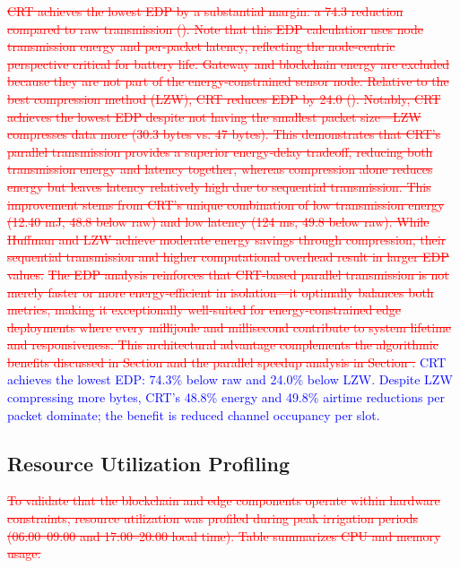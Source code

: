 \documentclass[pdflatex,sn-mathphys-num]{sn-jnl}
\theoremstyle{thmstyleone}
\theoremstyle{thmstyletwo}
\theoremstyle{thmstylethree}
\begin{document}
{\textcolor{red}{\sout{CRT achieves the lowest EDP by a substantial margin: a 74.3 reduction compared to raw transmission (). Note that this EDP calculation uses node transmission energy and per-packet latency, reflecting the node-centric perspective critical for battery life. Gateway and blockchain energy are excluded because they are not part of the energy-constrained sensor node. Relative to the best compression method (LZW), CRT reduces EDP by 24.0 (). Notably, CRT achieves the lowest EDP despite not having the smallest packet size---LZW compresses data more (30.3 bytes vs. 47 bytes). This demonstrates that CRT's parallel transmission provides a superior energy‑delay tradeoff, reducing both transmission energy and latency together, whereas compression alone reduces energy but leaves latency relatively high due to sequential transmission. This improvement stems from CRT's unique combination of low transmission energy (12.40 mJ, 48.8 below raw) and low latency (124 ms, 49.8 below raw). While Huffman and LZW achieve moderate energy savings through compression, their sequential transmission and higher computational overhead result in larger EDP values.}}
\textcolor{red}{\sout{The EDP analysis reinforces that CRT-based parallel transmission is not merely faster or more energy-efficient in isolation—it optimally balances both metrics, making it exceptionally well-suited for energy-constrained edge deployments where every millijoule and millisecond contribute to system lifetime and responsiveness. This architectural advantage complements the algorithmic benefits discussed in Section and the parallel speedup analysis in Section .}}
\textcolor{blue}{CRT achieves the lowest EDP: 74.3\% below raw and 24.0\% below LZW. Despite LZW compressing more bytes, CRT's 48.8\% energy and 49.8\% airtime reductions per packet dominate; the benefit is reduced channel occupancy per slot.}

\subsection{Resource Utilization Profiling}
\label{subsec:resource_utilization}
\textcolor{red}{\sout{To validate that the blockchain and edge components operate within hardware constraints, resource utilization was profiled during peak irrigation periods (06:00–09:00 and 17:00–20:00 local time). Table summarizes CPU and memory usage.}}

}
\end{document}
